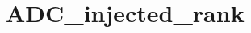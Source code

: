 \hypertarget{group___a_d_c__injected__rank}{\section{A\-D\-C\-\_\-injected\-\_\-rank}
\label{group___a_d_c__injected__rank}
}

